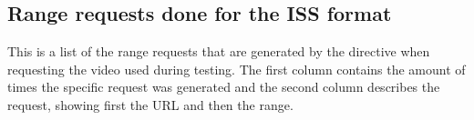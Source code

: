 \documentclass[twoside,openright]{uva-bachelor-thesis}
\begin{document}
\printbibliography[heading=bibintoc]{}

\printglossaries{}
\begin{appendices}
    \chapter{Range requests done for the ISS format}\label{ap:log}
    This is a list of the range requests that are generated by the \ipplong
    directive when requesting the video used during testing. The first column
    contains the amount of times the specific request was generated and the
    second column describes the request, showing first the URL and then the
    range.
\end{appendices}
\end{document}
